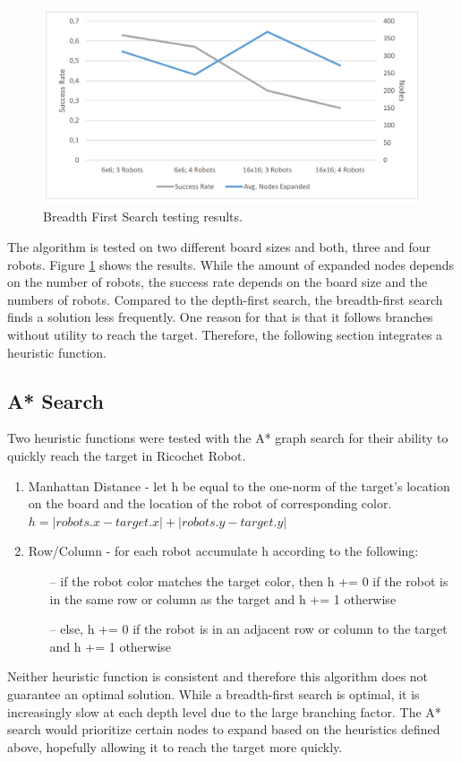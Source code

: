 \documentclass[a4paper,10pt]{article}
\begin{document}
	  \begin{figure}
	  	\centering
	  	\includegraphics[scale=0.47]{figures/Bfs_test_results.PNG}
	  	\caption{Breadth First Search testing results.}
	  	\label{fig:bfs_test}
	  \end{figure}





  The algorithm is tested on two different board sizes and both, three and four robots. Figure \ref{fig:bfs_test} shows the results. While the amount of expanded nodes depends on the number of robots, the success rate depends on the board size and the numbers of robots. Compared to the depth-first search, the breadth-first search finds a solution less frequently. One reason for that is that it follows branches without utility to reach the target. Therefore, the following section integrates a heuristic function.

  \subsection{A* Search}
  Two heuristic functions were tested with the A* graph search for their ability to quickly reach the target in Ricochet Robot.
  \begin{enumerate}
    \item Manhattan Distance - let h be equal to the one-norm of the target's location on the board and the location of the robot of corresponding color. \\
    $h = |robots.x - target.x| + |robots.y - target.y|$
    \item Row/Column - for each robot accumulate h according to the following:
    \begin{itemize}
      \item[--] if the robot color matches the target color, then h += 0 if the robot is in the same row or column as the target and h += 1 otherwise
      \item[--] else, h += 0 if the robot is in an adjacent row or column to the target and h += 1 otherwise
    \end{itemize}
  \end{enumerate}
  Neither heuristic function is consistent and therefore this algorithm does not guarantee an optimal solution.  While a breadth-first search is optimal,
  it is increasingly slow at each depth level due to the large branching factor.  The A* search would prioritize certain nodes to expand based on the heuristics
  defined above, hopefully allowing it to reach the target more quickly. \\
\end{document}
